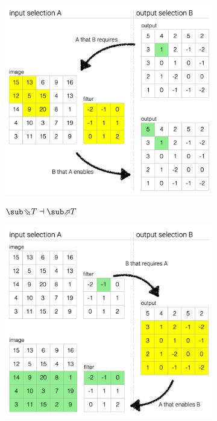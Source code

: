 \begin{figure}
   \begin{subfigure}{0.53\textwidth}
      {\includegraphics[scale=0.38]{fig/example/4-relations-1.png}}
      \vspace{2mm}
      \caption{$\evalBwdF{T} \adjoint \evalFwdF{T}$}
   \end{subfigure}
   \begin{subfigure}{0.46\textwidth}
      {\includegraphics[scale=0.38]{fig/example/4-relations-2.png}}

\end{subfigure}
\end{figure}
